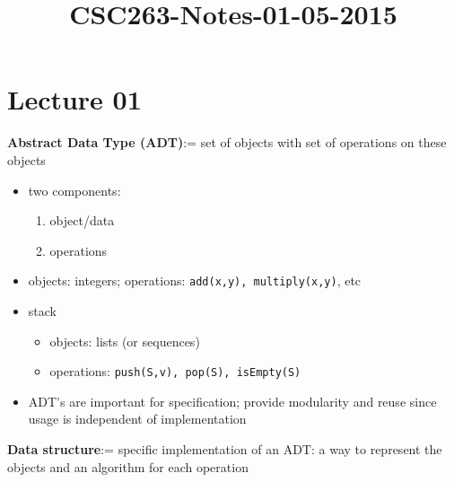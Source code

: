 



\title{CSC263-Notes-01-05-2015}



\section*{Lecture 01}

\noindent \textbf{Abstract Data Type (ADT)}:= set of objects with set of
operations on these objects
\begin{itemize}
    \item two components:
        \begin{enumerate}
            \item object/data
            \item operations
        \end{enumerate}
    \item objects: integers; operations: \texttt{add(x,y), multiply(x,y)},
        etc
    \item stack
        \begin{itemize}
            \item objects: lists (or sequences)
            \item operations: \texttt{push(S,v), pop(S),
                isEmpty(S)}
        \end{itemize}
    \item ADT's are important for specification; provide modularity and
        reuse since usage is independent of implementation
\end{itemize}

\noindent \textbf{Data structure}:= specific implementation of an ADT: a way to
represent the objects and an algorithm for each operation \\

